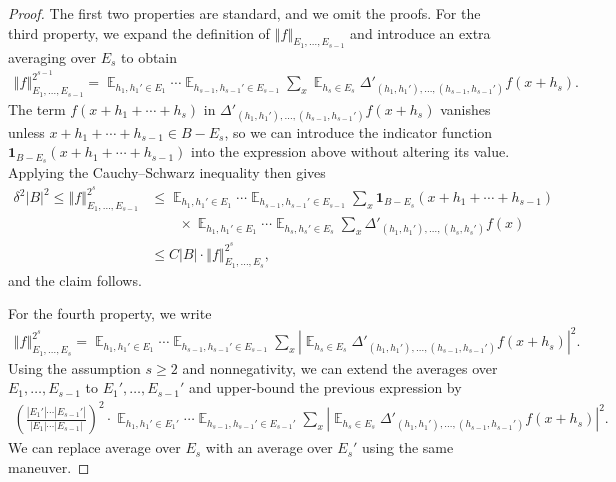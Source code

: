 \documentclass[11pt]{amsart}
\theoremstyle{definition}
\DeclareMathOperator*{\E}{\mathbb{E}}
\newcommand{\norm}[1]{\left\Vert #1\right\Vert}
\newcommand{\abs}[1]{\mathopen{}\left| #1\mathclose{}\right|}
\newcommand{\brac}[1]{\mathopen{}\left( #1 \mathclose{}\right)}
\begin{document}
\begin{proof}

The first two properties are standard, and we omit the proofs. For the third property, we expand the definition of $\norm{f}_{E_1, \ldots, E_{s-1}}$ and introduce an extra averaging over $E_s$ to obtain
\begin{align*}
    \norm{f}_{E_1, \ldots, E_{s-1}}^{2^{s-1}} = \E_{h_1, h_1'\in E_1}\cdots\E_{h_{s-1}, h_{s-1}'\in E_{s-1}}\sum_x \E_{h_s\in E_s} \Delta'_{(h_1, h_1'), \ldots, (h_{s-1},h_{s-1}')}f(x+h_s).
\end{align*}
The term $f(x+h_1 + \cdots + h_s)$ in $\Delta'_{(h_1, h_1'), \ldots, (h_{s-1},h_{s-1}')}f(x+h_s)$ vanishes unless $x+h_1+\cdots + h_{s-1} \in B - E_s$, so we can introduce the indicator function $\mathbf{1}_{B-E_s}(x+h_1+\cdots + h_{s-1})$ into the expression above without altering its value. Applying the Cauchy--Schwarz inequality then gives
\begin{align*}
    \delta^2 |B|^2 \leq \norm{f}_{E_1, \ldots, E_{s-1}}^{2^s} &\leq \E_{h_1, h_1'\in E_1}\cdots\E_{h_{s-1}, h_{s-1}'\in E_{s-1}}\sum_x \mathbf{1}_{B-E_s}(x+h_1+\cdots + h_{s-1})\\
    & \qquad \times \E_{h_1, h_1'\in E_1}\cdots\E_{h_s, h_s'\in E_s}\sum_x \Delta'_{(h_1, h_1'), \ldots, (h_s,h_s')}f(x)\\
    & \leq C|B| \cdot \norm{f}_{E_1, \ldots, E_s}^{2^s},
\end{align*}
and the claim follows.

For the fourth property, we write
    \begin{align*}
        \norm{f}_{E_1, \ldots, E_s}^{2^s} = \E_{h_1, h_1'\in E_1}\cdots \E_{h_{s-1}, h_{s-1}'\in E_{s-1}}\sum_x \abs{\E_{h_s\in E_s}\Delta'_{(h_1, h_1'), \ldots, (h_{s-1}, h_{s-1}')}f(x+h_s)}^2.
    \end{align*}
    Using the assumption $s\geq 2$ and nonnegativity, we can extend the averages over $E_1, \ldots, E_{s-1}$ to $E_1', \ldots, E_{s-1}'$ and upper-bound the previous expression by
    \begin{align*}
        \brac{\frac{|E_1'|\cdots|E_{s-1}'|}{|E_1|\cdots|E_{s-1}|}}^2\cdot \E_{h_1, h_1'\in E_1'}\cdots \E_{h_{s-1}, h_{s-1}'\in E_{s-1}'}\sum_x \abs{\E_{h_s\in E_s}\Delta'_{(h_1, h_1'), \ldots, (h_{s-1}, h_{s-1}')}f(x+h_s)}^2.
    \end{align*}    
    We can replace average over $E_s$ with an average over $E_s'$ using the same maneuver.


\end{proof}
\end{document}
